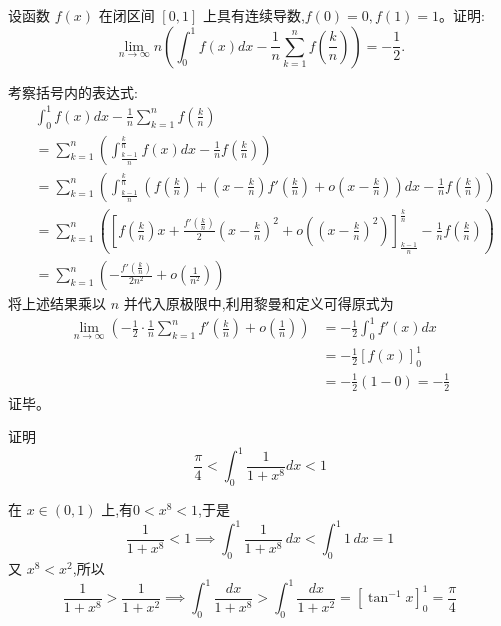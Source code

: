 \begin{questions}
    \question 设函数 $f(x)$ 在闭区间 $[0, 1]$ 上具有连续导数,$f(0) = 0,f(1) = 1$。证明:
    \[
    \lim_{n \to \infty} n \left( \int_{0}^{1} f(x) dx - \frac{1}{n} \sum_{k=1}^{n} f\left( \frac{k}{n} \right) \right) = -\frac{1}{2}.
    \]
    \begin{solution}
        考察括号内的表达式:
        \begin{align*}
        &\int_{0}^{1} f(x) dx - \frac{1}{n} \sum_{k=1}^{n} f\left( \frac{k}{n} \right)\\
        &= \sum_{k=1}^{n} \left( \int_{\frac{k-1}{n}}^{\frac{k}{n}} f(x) dx - \frac{1}{n}f(\frac{k}{n}) \right) \\
        &= \sum_{k=1}^{n} \left( \int_{\frac{k-1}{n}}^{\frac{k}{n}} \left( f\left(\frac{k}{n}\right) + \left(x - \frac{k}{n}\right)f'\left(\frac{k}{n}\right) + o\left(x - \frac{k}{n}\right) \right) dx - \frac{1}{n}f(\frac{k}{n}) \right) \\
        &= \sum_{k=1}^{n} \left( \left[ f\left(\frac{k}{n}\right)x + \frac{f'(\frac{k}{n})}{2}\left(x - \frac{k}{n}\right)^2 + o\left(\left(x - \frac{k}{n}\right)^2\right) \right]_{\frac{k-1}{n}}^{\frac{k}{n}} - \frac{1}{n}f(\frac{k}{n}) \right) \\
        &= \sum_{k=1}^{n} \left( -\frac{f'(\frac{k}{n})}{2n^2} + o\left(\frac{1}{n^2}\right) \right)
        \end{align*}
        将上述结果乘以 $n$ 并代入原极限中,利用黎曼和定义可得原式为
        \begin{align*}
        \lim_{n \to \infty} \left( -\frac{1}{2} \cdot \frac{1}{n} \sum_{k=1}^{n} f'\left(\frac{k}{n}\right) + o\left(\frac{1}{n}\right) \right) 
        &= -\frac{1}{2} \int_{0}^{1} f'(x) dx \\
        &= -\frac{1}{2} [f(x)]_{0}^{1} \\
        &= -\frac{1}{2} (1 - 0) = -\frac{1}{2}
        \end{align*}
        证毕。
    \end{solution}

    \question 证明
    \[
    \frac{\pi}{4} < \int_{0}^{1} \frac{1}{1+x^8} dx < 1
    \]
    \begin{solution}
        在 $x \in (0,1)$ 上,有$0 < x^8 < 1$,于是
        \[
        \frac{1}{1+x^8} < 1 \implies \int_{0}^{1} \frac{1}{1+x^8} \,dx < \int_{0}^{1} 1 \,dx = 1
        \]
        又 $x^8 < x^2$,所以 
        \[
        \frac{1}{1+x^8} > \frac{1}{1+x^2} \implies \int_{0}^{1} \frac{dx}{1+x^8} > \int_{0}^{1} \frac{dx}{1+x^2} = [\tan^{-1}x]_0^1 = \frac{\pi}{4}
        \]
    \end{solution}
    

\end{questions}

